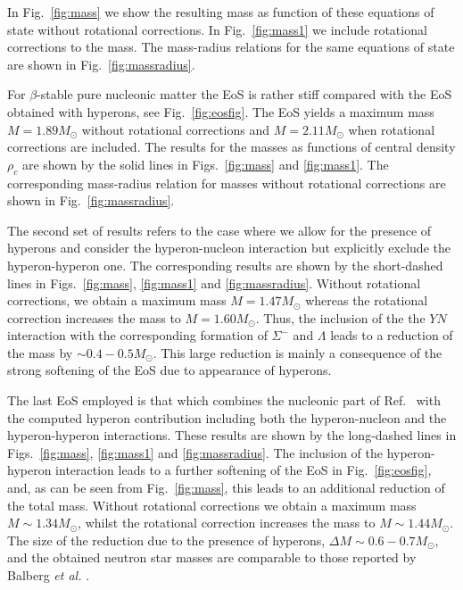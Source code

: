 In Fig.\ \ref{fig:mass} we show the resulting mass as function
of these equations of state without rotational 
corrections. In Fig.~\ref{fig:mass1} 
we include rotational corrections to the mass. The mass-radius relations
for the same equations of state are shown in
Fig.~\ref{fig:massradius}.

For $\beta$-stable pure nucleonic matter 
the EoS is rather stiff compared
with the EoS obtained with hyperons, see Fig.\ \ref{fig:eosfig}.
The EoS yields a maximum mass $M= 1.89M_\odot$ without
rotational corrections and $M=2.11M_\odot$ when rotational
corrections are included. The results for the masses as functions of central
density $\rho_c$ are shown by the solid lines 
in Figs.\ \ref{fig:mass} and \ref{fig:mass1}.
The corresponding mass-radius relation for masses without rotational
corrections are shown in Fig.~\ref{fig:massradius}.

The second set of results refers to the case where we allow for the presence of 
hyperons and consider the 
hyperon-nucleon interaction but explicitly exclude the hyperon-hyperon one. The
corresponding results are shown by the short-dashed lines in Figs.~\ref{fig:mass},
\ref{fig:mass1} and \ref{fig:massradius}. 
Without rotational corrections, we obtain
a maximum mass $M=1.47M_\odot$ whereas the rotational correction 
increases the mass to  $M= 1.60 M_\odot$. 
Thus, the inclusion of the the $YN$ interaction with the corresponding 
formation of $\Sigma^-$ and $\Lambda$ leads to a reduction 
of the mass by $\sim 0.4-0.5 M_{\odot}$. 
This large reduction is mainly a consequence of the strong softening of the EoS due to 
appearance of hyperons.

The last EoS employed is that which combines the nucleonic
part of Ref.\ \cite{apr98} with the computed hyperon 
contribution including both the hyperon-nucleon and 
the hyperon-hyperon interactions. 
These results are shown by the long-dashed lines in Figs.~\ref{fig:mass},
\ref{fig:mass1} and \ref{fig:massradius}.
The inclusion of the hyperon-hyperon interaction leads
to a further softening of the EoS in Fig.~\ref{fig:eosfig}, and,
as can be seen from Fig.\ \ref{fig:mass}, 
this leads to an 
additional 
reduction of the total mass. 
Without rotational corrections we obtain
a maximum mass $M\sim 1.34M_\odot$, whilst the rotational correction 
increases the mass to  $M\sim 1.44 M_\odot$. The size of the 
reduction due to the presence of hyperons, $\Delta M\sim 0.6-0.7M_\odot$, and the obtained 
neutron star masses are comparable
to those reported by Balberg {\em et al.} \cite{blc99}. 


